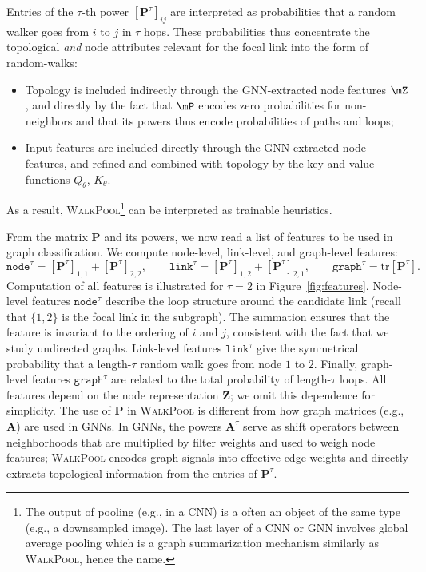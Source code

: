 \documentclass[11pt]{article}
\newcommand{\walkpool}{\textsc{WalkPool}\xspace}
\newcommand{\UPDATE}[1]{\textcolor{WowColor}{{#1}}}
\renewcommand{\UPDATE}[1]{#1}
\begin{document}
Entries of the $\tau$-th power $[\mathbf{P}^{\tau}]_{ij}$ are interpreted as    probabilities that a random walker goes from  $i$ to $j$ in $\tau$ hops. These probabilities thus concentrate the topological \emph{and} node attributes relevant for the focal link into the form of random-walks:
\vspace{-1mm}
\begin{itemize}
    \item Topology is included indirectly through the GNN-extracted node features $\mZ$, and directly by the fact that $\mP$ encodes zero probabilities for non-neighbors and that its powers thus encode probabilities of paths and loops;
    \item Input features are included directly through the GNN-extracted node features, and refined and combined with topology by the key and value functions $Q_\theta$, $K_\theta$.
\end{itemize}
As a result, \walkpool\footnote{The output of pooling (e.g., in a CNN) is a often an object of the same type (e.g., a downsampled image). The last layer of a  CNN or GNN involves global average pooling which is a graph summarization mechanism similarly as \walkpool, hence the name.} can be interpreted as trainable heuristics.

From the matrix $\mathbf{P}$ and its powers, we now read a list of features to be used in graph classification. We compute node-level, link-level, and graph-level features:
\begin{equation}\label{eq:wp_profiles}
    \mathtt{node}^{\tau} = [\mathbf{P}^{\tau}]_{1,1} + [\mathbf{P}^{\tau}]_{2,2}, \quad \quad
    \mathtt{link}^{\tau} = [\mathbf{P}^{\tau}]_{1,2} + [\mathbf{P}^{\tau}]_{2,1}, \quad \quad
    \mathtt{graph}^{\tau} = \mathrm{tr} [\mathbf{P}^{\tau}].
\end{equation}
Computation of all features is illustrated for $\tau = 2$ in Figure~\ref{fig:features}. Node-level features $\mathtt{node}^\tau$ describe the loop structure around the candidate link (recall that $\{1, 2\}$ is the focal link in the subgraph). The summation ensures that the feature is invariant to the ordering of $i$ and $j$, consistent with the fact that we study undirected graphs. Link-level features $\mathtt{link}^\tau$ give the symmetrical probability that a length-$\tau$ random walk goes from node $1$ to $2$. Finally, graph-level features $\mathtt{graph}^\tau$ are related to the total probability of length-$\tau$ loops. All features depend on the node representation $\mathbf{Z}$; we omit this dependence for simplicity. \UPDATE{The use of  $\mathbf{P}$ in \walkpool is different from how graph matrices (e.g., $\mathbf{A}$) are used in GNNs. In GNNs, the powers $\mathbf{A}^{\tau}$ serve as shift operators between neighborhoods that are multiplied by filter weights and used to weigh node features; \walkpool encodes graph signals into effective edge weights and directly extracts topological information from the entries of $\mathbf{P}^\tau$.}
\vspace{-1mm}
\end{document}

